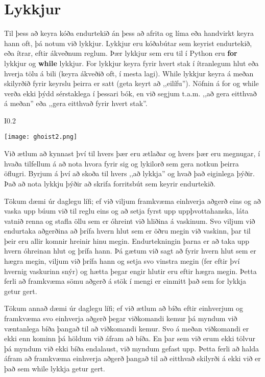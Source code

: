 
\chapter{Lykkjur}\label{k:lykkjur}
Til þess að keyra kóða endurtekið án þess að afrita og líma eða handvirkt keyra hann oft, þá notum við lykkjur.
Lykkjur eru kóðabútar sem keyrist endurtekið, eða ítrar, eftir ákveðnum reglum.
Þær lykkjur sem eru til í Python eru \textbf{for} lykkjur og \textbf{while} lykkjur.
For lykkjur keyra fyrir hvert stak í ítranlegum hlut eða hverja tölu á bili (keyra ákveðið oft, í mesta lagi).
While lykkjur keyra á meðan skilyrðið fyrir keyrslu þeirra er satt (geta keyrt að ,,eilífu'').
Nöfnin á for og while verða ekki þýdd sérstaklega í þessari bók, en við segjum t.a.m. ,,að gera eitthvað á meðan'' eða ,,gera eitthvað fyrir hvert stak''.
\begin{wrapfigure}{I}{0.2\textwidth} %
	\begin{center}
		\texttt{[image: ghoist2.png]}
	\end{center}
\end{wrapfigure}
Við ætlum að kynnast því til hvers þær eru ætlaðar og hvers þær eru megnugar, í hvaða tilfellum á að nota hvora fyrir sig og lykilorð sem gera notkun þeirra öflugri.
Byrjum á því að skoða til hvers ,,að lykkja'' og hvað það eiginlega þýðir.
Það að nota lykkju þýðir að skrifa forritsbút sem keyrir endurtekið.

Tökum dæmi úr daglegu lífi; ef við viljum framkvæma einhverja aðgerð eins og að vaska upp búum við til reglu eins og að setja fyrst upp uppþvottahanska, láta vatnið renna og stafla öllu sem er óhreint við hliðina á vaskinum. 
Svo viljum við endurtaka aðgerðina að þrífa hvern hlut sem er öðru megin við vaskinn, þar til þeir eru allir komnir hreinir hinu megin.
Endurtekningin þarna er að taka upp hvern óhreinan hlut og þrífa hann.
Þá gætum við sagt að fyrir hvern hlut sem er hægra megin, viljum við þrífa hann og setja svo vinstra megin (fer eftir því hvernig vaskurinn snýr) og hætta þegar engir hlutir eru eftir hægra megin.
Þetta ferli að framkvæma sömu aðgerð á stök í mengi er einmitt það sem for lykkja getur gert.

Tökum annað dæmi úr daglegu lífi; ef við ætlum að bíða eftir einhverjum og framkvæma svo einhverja aðgerð þegar viðkomandi kemur þá myndum við væntanlega bíða þangað til að viðkomandi kemur.
Svo á meðan viðkomandi er ekki enn kominn þá höldum við áfram að bíða.
En þar sem við erum ekki tölvur þá myndum við ekki bíða endalaust, við myndum gefast upp.
Þetta ferli að halda áfram að framkvæma einhverja aðgerð þangað til að eitthvað skilyrði á ekki við er það sem while lykkja getur gert.

